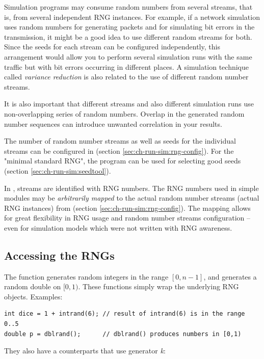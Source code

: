 Simulation programs may consume random numbers from several streams,
that is, from several independent RNG instances. For example, if a
network simulation uses random numbers for generating packets and
for simulating bit errors in the transmission, it might be a good
idea to use different random streams for both. Since the seeds
for each stream can be configured independently, this arrangement
would allow you to perform several simulation runs with the same traffic
but with bit errors occurring in different places.
A simulation technique called \textit{variance reduction} is
also related to the use of different random number streams.

It is also important that different streams and also different
simulation runs use non-overlapping series of random numbers.
Overlap in the generated random number sequences can introduce
unwanted correlation in your results.

The number of random number streams as well as seeds for the individual
streams can be configured in 
(section \ref{sec:ch-run-sim:rng-config}).
For the "minimal standard RNG", the  program can be
used for selecting good seeds (section \ref{sec:ch-run-sim:seedtool}).

In {\opp}, streams are identified with RNG numbers. The RNG numbers
used in simple modules may be \textit{arbitrarily mapped} to the actual
random number streams (actual RNG instances) from 
(section \ref{sec:ch-run-sim:rng-config}). The mapping allows
for great flexibility in RNG usage and random number streams
configuration -- even for simulation models which were not written
with RNG awareness.


\subsection{Accessing the RNGs}

The  function generates random integers in the range $[0, n-1]$, and
 generates a random double on $[0,1)$. These functions
simply wrap the underlying RNG objects. Examples:

\begin{verbatim}
int dice = 1 + intrand(6); // result of intrand(6) is in the range 0..5
double p = dblrand();      // dblrand() produces numbers in [0,1)
\end{verbatim}

They also have a counterparts that use generator \textit{k}:

